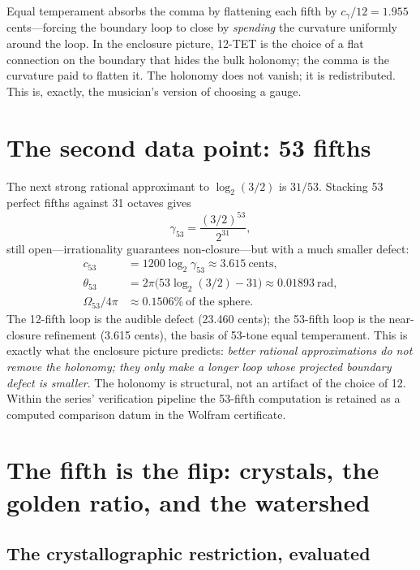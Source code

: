 \documentclass[11pt]{article}
\theoremstyle{remark}
\begin{document}
Equal temperament absorbs the comma by flattening each fifth by $c_\gamma / 12 = 1.955$ cents---forcing the boundary loop to close by \emph{spending} the curvature uniformly around the loop. In the enclosure picture, 12-TET is the choice of a flat connection on the boundary that hides the bulk holonomy; the comma is the curvature paid to flatten it. The holonomy does not vanish; it is redistributed. This is, exactly, the musician's version of choosing a gauge.

\section{The second data point: 53 fifths}
\label{sec:fiftythree}

The next strong rational approximant to $\log_2(3/2)$ is $31/53$. Stacking 53 perfect fifths against 31 octaves gives
\begin{equation}
\gamma_{53} = \frac{(3/2)^{53}}{2^{31}},
\end{equation}
still open---irrationality guarantees non-closure---but with a much smaller defect:
\begin{align}
c_{53} &= 1200 \log_2 \gamma_{53} \approx 3.615\ \text{cents},\\
\theta_{53} &= 2\pi\big(53\log_2(3/2) - 31\big) \approx 0.01893\ \text{rad},\\
\Omega_{53}/4\pi &\approx 0.1506\%\ \text{of the sphere}.
\end{align}
The 12-fifth loop is the audible defect (23.460 cents); the 53-fifth loop is the near-closure refinement (3.615 cents), the basis of 53-tone equal temperament. This is exactly what the enclosure picture predicts: \emph{better rational approximations do not remove the holonomy; they only make a longer loop whose projected boundary defect is smaller}. The holonomy is structural, not an artifact of the choice of 12. Within the series' verification pipeline the 53-fifth computation is retained as a computed comparison datum in the Wolfram certificate.

\section{The fifth is the flip: crystals, the golden ratio, and the watershed}
\label{sec:fifth}

\subsection{The crystallographic restriction, evaluated}
\end{document}
